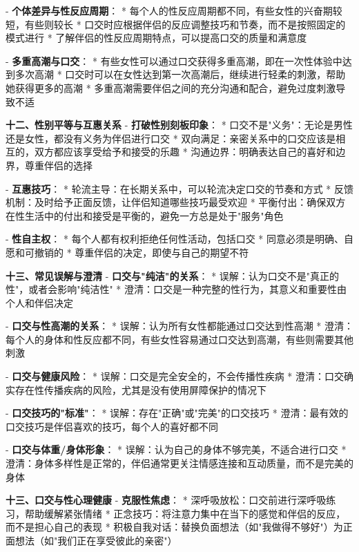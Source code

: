 \begin{enumerate}
  - \textbf{个体差异与性反应周期}：
    * 每个人的性反应周期都不同，有些女性的兴奋期较短，有些则较长
    * 口交时应根据伴侣的反应调整技巧和节奏，而不是按照固定的模式进行
    * 了解伴侣的性反应周期特点，可以提高口交的质量和满意度

  - \textbf{多重高潮与口交}：
    * 有些女性可以通过口交获得多重高潮，即在一次性体验中达到多次高潮
    * 口交时可以在女性达到第一次高潮后，继续进行轻柔的刺激，帮助她获得更多的高潮
    * 多重高潮需要伴侣之间的充分沟通和配合，避免过度刺激导致不适

  \textbf{十二、性别平等与互惠关系}
  - \textbf{打破性别刻板印象}：
    * 口交不是"义务"：无论是男性还是女性，都没有义务为伴侣进行口交
    * 双向满足：亲密关系中的口交应该是相互的，双方都应该享受给予和接受的乐趣
    * 沟通边界：明确表达自己的喜好和边界，尊重伴侣的选择

  - \textbf{互惠技巧}：
    * 轮流主导：在长期关系中，可以轮流决定口交的节奏和方式
    * 反馈机制：及时给予正面反馈，让伴侣知道哪些技巧最受欢迎
    * 平衡付出：确保双方在性生活中的付出和接受是平衡的，避免一方总是处于"服务"角色

  - \textbf{性自主权}：
    * 每个人都有权利拒绝任何性活动，包括口交
    * 同意必须是明确、自愿和可撤销的
    * 尊重伴侣的决定，即使与自己的期望不符

  \textbf{十三、常见误解与澄清}
  - \textbf{口交与"纯洁"的关系}：
    * 误解：认为口交不是"真正的性"，或者会影响"纯洁性"
    * 澄清：口交是一种完整的性行为，其意义和重要性由个人和伴侣决定

  - \textbf{口交与性高潮的关系}：
    * 误解：认为所有女性都能通过口交达到性高潮
    * 澄清：每个人的身体和性反应都不同，有些女性容易通过口交达到高潮，有些则需要其他刺激

  - \textbf{口交与健康风险}：
    * 误解：口交是完全安全的，不会传播性疾病
    * 澄清：口交确实存在性传播疾病的风险，尤其是没有使用屏障保护的情况下

  - \textbf{口交技巧的"标准"}：
    * 误解：存在"正确"或"完美"的口交技巧
    * 澄清：最有效的口交技巧是伴侣喜欢的技巧，每个人的喜好都不同

  - \textbf{口交与体重/身体形象}：
    * 误解：认为自己的身体不够完美，不适合进行口交
    * 澄清：身体多样性是正常的，伴侣通常更关注情感连接和互动质量，而不是完美的身体

  \textbf{十三、口交与性心理健康}
  - \textbf{克服性焦虑}：
    * 深呼吸放松：口交前进行深呼吸练习，帮助缓解紧张情绪
    * 正念技巧：将注意力集中在当下的感觉和伴侣的反应，而不是担心自己的表现
    * 积极自我对话：替换负面想法（如"我做得不够好"）为正面想法（如"我们正在享受彼此的亲密"）


\end{enumerate}
